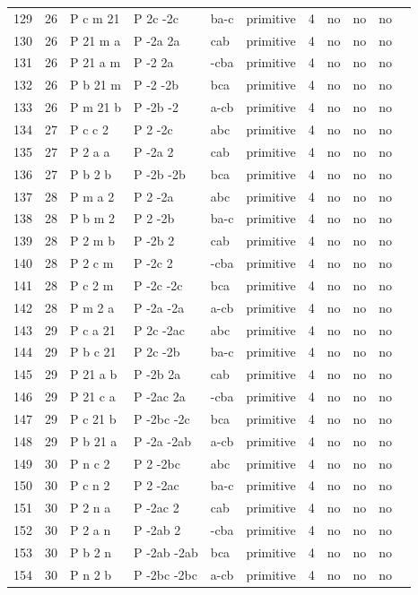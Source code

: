 \begin{center}
\begin{small}
\begin{longtable}{|l|l|l|l|l|l|l|l|l|l|l|}
129 &26 &P c m 21 &P 2c -2c &ba-c &primitive &4 &no &no &no \\ 
130 &26 &P 21 m a &P -2a 2a &cab &primitive &4 &no &no &no \\ 
131 &26 &P 21 a m &P -2 2a &-cba &primitive &4 &no &no &no \\ 
132 &26 &P b 21 m &P -2 -2b &bca &primitive &4 &no &no &no \\ 
133 &26 &P m 21 b &P -2b -2 &a-cb &primitive &4 &no &no &no \\ 
134 &27 &P c c 2 &P 2 -2c &abc &primitive &4 &no &no &no \\ 
135 &27 &P 2 a a &P -2a 2 &cab &primitive &4 &no &no &no \\ 
136 &27 &P b 2 b &P -2b -2b &bca &primitive &4 &no &no &no \\ 
137 &28 &P m a 2 &P 2 -2a &abc &primitive &4 &no &no &no \\ 
138 &28 &P b m 2 &P 2 -2b &ba-c &primitive &4 &no &no &no \\ 
139 &28 &P 2 m b &P -2b 2 &cab &primitive &4 &no &no &no \\ 
140 &28 &P 2 c m &P -2c 2 &-cba &primitive &4 &no &no &no \\ 
141 &28 &P c 2 m &P -2c -2c &bca &primitive &4 &no &no &no \\ 
142 &28 &P m 2 a &P -2a -2a &a-cb &primitive &4 &no &no &no \\ 
143 &29 &P c a 21 &P 2c -2ac &abc &primitive &4 &no &no &no \\ 
144 &29 &P b c 21 &P 2c -2b &ba-c &primitive &4 &no &no &no \\ 
145 &29 &P 21 a b &P -2b 2a &cab &primitive &4 &no &no &no \\ 
146 &29 &P 21 c a &P -2ac 2a &-cba &primitive &4 &no &no &no \\ 
147 &29 &P c 21 b &P -2bc -2c &bca &primitive &4 &no &no &no \\ 
148 &29 &P b 21 a &P -2a -2ab &a-cb &primitive &4 &no &no &no \\ 
149 &30 &P n c 2 &P 2 -2bc &abc &primitive &4 &no &no &no \\ 
150 &30 &P c n 2 &P 2 -2ac &ba-c &primitive &4 &no &no &no \\ 
151 &30 &P 2 n a &P -2ac 2 &cab &primitive &4 &no &no &no \\ 
152 &30 &P 2 a n &P -2ab 2 &-cba &primitive &4 &no &no &no \\ 
153 &30 &P b 2 n &P -2ab -2ab &bca &primitive &4 &no &no &no \\ 
154 &30 &P n 2 b &P -2bc -2bc &a-cb &primitive &4 &no &no &no \\ 

\end{longtable}
\end{small}
\end{center}
